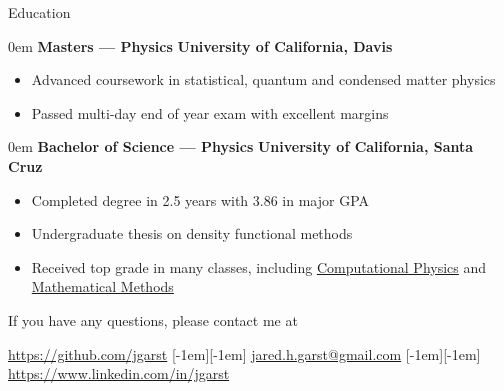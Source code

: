 \documentclass[11pt,a4paper]{article}
\newenvironment{headedsection}[2]{
    \begin{addmargin}[0.5em]{0em}
    {\large\bfseries #1} \hfill {\bfseries #2}%
    \begin{itemize}
        [label={}, topsep=0pt, itemsep=1.5pt, parsep=0pt, leftmargin=1.5em]
}{
    \end{itemize}
    \end{addmargin}
    \medskip
}
\newcommand*\sbull{%
    \raisebox{-0.550ex}[-1em][-1em]{\textscale{2}{\( \cdot \)}}\xspace
}
\begin{document}
\begin{mysection}{Education}
    \begin{headedsection}{Masters --- Physics}
          {University of California, Davis}

        \item Advanced coursework in statistical, quantum and condensed matter
            physics
        \item Passed multi-day end of year exam with excellent margins
    \end{headedsection}

    \begin{headedsection}{Bachelor of Science --- Physics}
          {University of California, Santa Cruz}

        \item Completed degree in 2.5 years with 3.86 in major GPA
        \item Undergraduate thesis on density functional methods
        \item Received top grade in many classes, including 
            \href{http://young.physics.ucsc.edu/115/}{Computational Physics}
            and
            \href{http://scipp.ucsc.edu/~haber/ph116C/}{Mathematical Methods}
    \end{headedsection}
\end{mysection}

\vfill

\begin{center}
    If you have any questions, please contact me at
\end{center}

\begin{center}
    \href{https://github.com/jgarst}{https://github.com/jgarst} 
    \sbull{} 
    \href{jared.h.garst@gmail.com}{jared.h.garst@gmail.com} 
    \sbull{} 
    \href{https://www.linkedin.com/in/jgarst}
        {https://www.linkedin.com/in/jgarst}
\end{center}
\end{document}
